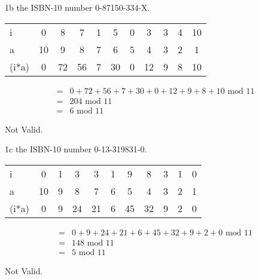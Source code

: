 \begin{question}{1b} %
the ISBN-10 number 0-87150-334-X.

\begin{tabular}{l|cccccccccc}
\hline
i     & 0  & 8  & 7  & 1  & 5  & 0  & 3  & 3  & 4 & 10 \\
a     & 10 & 9  & 8  & 7  & 6  & 5  & 4  & 3  & 2 & 1 \\
\hline
(i*a) & 0  & 72 & 56 & 7  & 30 & 0  & 12 & 9  & 8 & 10
\end{tabular}

\begin{align*}
=&0  + 72 + 56 + 7  + 30 + 0  + 12 + 9  + 8 + 10\textrm{ mod } 11\\
=&204 \textrm{ mod } 11\\
=&6 \textrm{ mod } 11
\end{align*}

Not Valid.
\end{question}


\begin{question}{1c} %
the ISBN-10 number 0-13-319831-0.

\begin{tabular}{l|cccccccccc}
\hline
i     & 0  & 1  & 3  & 3  & 1  & 9  & 8  & 3  & 1 & 0 \\
a     & 10 & 9  & 8  & 7  & 6  & 5  & 4  & 3  & 2 & 1 \\
\hline
(i*a) & 0  & 9  & 24 & 21 & 6  & 45 & 32 & 9  & 2 & 0
\end{tabular}

\begin{align*}
=& 0  + 9  + 24 + 21 + 6  + 45 + 32 + 9  + 2 + 0 \textrm{ mod } 11\\
=& 148 \textrm{ mod } 11\\
=& 5 \textrm{ mod } 11
\end{align*}

Not Valid.
\end{question}


